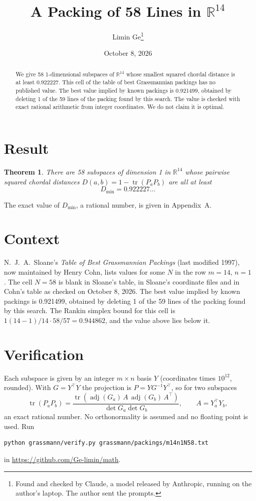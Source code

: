 \documentclass[11pt,a4paper]{article}
\title{A Packing of 58 Lines in $\mathbb{R}^{14}$}
\author{Limin Ge\thanks{Found and checked by Claude, a model released by Anthropic, running on the author's laptop. The author sent the prompts.}}
\date{October 8, 2026}
\newtheorem*{theorem}{Theorem}
\begin{document}
\maketitle
\begin{abstract}
We give 58 1-dimensional subspaces of $\mathbb{R}^{14}$ whose smallest squared chordal distance is at least 0.922227. This cell of the table of best Grassmannian packings has no published value. The best value implied by known packings is 0.921499, obtained by deleting 1 of the 59 lines of the packing found by this search. The value is checked with exact rational arithmetic from integer coordinates. We do not claim it is optimal.
\end{abstract}

\section{Result}
\begin{theorem}
There are 58 subspaces of dimension 1 in $\mathbb{R}^{14}$ whose pairwise squared chordal distances $D(a,b) = 1 - \operatorname{tr}(P_aP_b)$ are all at least
\[ D_{\min} = 0.922227\ldots \]
\end{theorem}
The exact value of $D_{\min}$, a rational number, is given in Appendix~A.


\section{Context}
N.~J.~A.~Sloane's \emph{Table of Best Grassmannian Packings} (last modified 1997), now maintained by Henry Cohn, lists values for some $N$ in the row $m=14$, $n=1$. The cell $N=58$ is blank in Sloane's table, in Sloane's coordinate files and in Cohn's table as checked on October 8, 2026. The best value implied by known packings is 0.921499, obtained by deleting 1 of the 59 lines of the packing found by this search. The Rankin simplex bound for this cell is $1(14-1)/14\cdot 58/57 = 0.944862$, and the value above lies below it.


\section{Verification}
Each subspace is given by an integer $m\times n$ basis $Y$ (coordinates times $10^{12}$, rounded). With $G=Y^\top Y$ the projection is $P=YG^{-1}Y^\top$, so for two subspaces
\[ \operatorname{tr}(P_aP_b)=\frac{\operatorname{tr}(\operatorname{adj}(G_a)\,A\,\operatorname{adj}(G_b)\,A^\top)}{\det G_a\det G_b},\qquad A=Y_a^\top Y_b, \]
an exact rational number. No orthonormality is assumed and no floating point is used. Run
\begin{verbatim}
python grassmann/verify.py grassmann/packings/m14n1N58.txt
\end{verbatim}
in \url{https://github.com/Ge-limin/math}.
\end{document}
